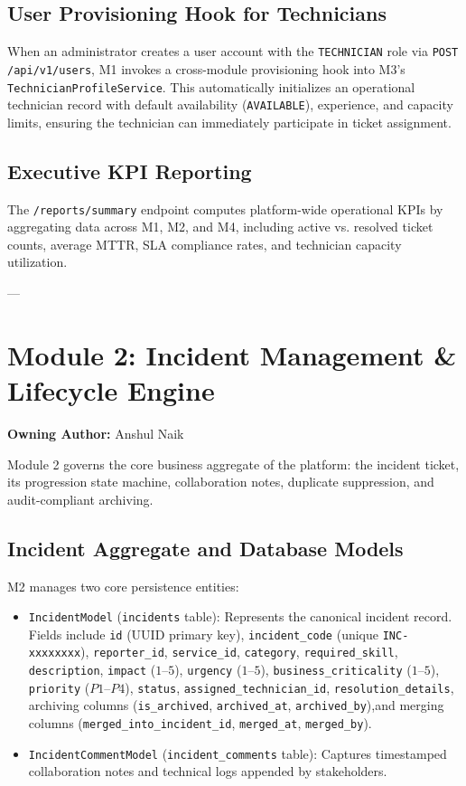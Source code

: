 \documentclass[11pt,a4paper,oneside]{report}
\begin{document}
\subsection{User Provisioning Hook for Technicians}
When an administrator creates a user account with the \texttt{TECHNICIAN} role via \texttt{POST /api/v1/users}, M1 invokes a cross-module provisioning hook into M3's \texttt{TechnicianProfileService}. This automatically initializes an operational technician record with default availability (\texttt{AVAILABLE}), experience, and capacity limits, ensuring the technician can immediately participate in ticket assignment.

\subsection{Executive KPI Reporting}
The \texttt{/reports/summary} endpoint computes platform-wide operational KPIs by aggregating data across M1, M2, and M4, including active vs. resolved ticket counts, average MTTR, SLA compliance rates, and technician capacity utilization.

---

\section{Module 2: Incident Management \& Lifecycle Engine}
\label{sec:module_m2}
\textbf{Owning Author:} Anshul Naik

Module 2 governs the core business aggregate of the platform: the incident ticket, its progression state machine, collaboration notes, duplicate suppression, and audit-compliant archiving.

\subsection{Incident Aggregate and Database Models}
M2 manages two core persistence entities:
{\small\raggedright
\begin{itemize}
    \item \texttt{IncidentModel} (\texttt{incidents} table): Represents the canonical incident record. Fields include \texttt{id} (UUID primary key), \texttt{incident\_code} (unique \texttt{INC-xxxxxxxx}), \texttt{reporter\_id}, \texttt{service\_id}, \texttt{category}, \texttt{required\_skill}, \texttt{description}, \texttt{impact} ($1$--$5$), \texttt{urgency} ($1$--$5$), \texttt{business\_criticality} ($1$--$5$), \texttt{priority} ($P1$--$P4$), \texttt{status}, \texttt{assigned\_technician\_id}, \texttt{resolution\_details}, archiving columns (\texttt{is\_archived}, \texttt{archived\_at}, \texttt{archived\_by}),\linebreak and merging columns (\texttt{merged\_into\_incident\_id}, \texttt{merged\_at}, \texttt{merged\_by}).
    \item \texttt{IncidentCommentModel} (\texttt{incident\_comments} table): Captures timestamped collaboration notes and technical logs appended by stakeholders.
\end{itemize}
}
\end{document}
